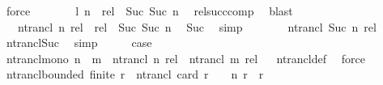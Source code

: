 \begin{isabellebody}
\ force\isanewline
\ \ \isamarkupfalse%
\ \isamarkupfalse%
\ {\isachardoublequoteopen}{\isasymdots}\ {\isacharequal}{\kern0pt}\ {\isacharquery}{\kern0pt}l\ n\ {\isasymunion}\ rel\ {\isacharcircum}{\kern0pt}{\isacharcircum}{\kern0pt}\ Suc\ {\isacharparenleft}{\kern0pt}Suc\ n{\isacharparenright}{\kern0pt}{\isachardoublequoteclose}\ \isamarkupfalse%
\ rel{\isacharunderscore}{\kern0pt}succ{\isacharunderscore}{\kern0pt}comp\ \isamarkupfalse%
\ blast\isanewline
\ \ \isamarkupfalse%
\ \isamarkupfalse%
\ {\isachardoublequoteopen}{\isasymdots}\ {\isacharequal}{\kern0pt}\ ntrancl\ n\ rel\ {\isasymunion}\ rel\ {\isacharcircum}{\kern0pt}{\isacharcircum}{\kern0pt}\ Suc\ {\isacharparenleft}{\kern0pt}Suc\ n{\isacharparenright}{\kern0pt}{\isachardoublequoteclose}\ \isamarkupfalse%
\ Suc\ \isamarkupfalse%
\ simp\isanewline
\ \ \isamarkupfalse%
\ \isamarkupfalse%
\ {\isachardoublequoteopen}{\isasymdots}\ {\isacharequal}{\kern0pt}\ ntrancl\ {\isacharparenleft}{\kern0pt}Suc\ n{\isacharparenright}{\kern0pt}\ rel{\isachardoublequoteclose}\ \isamarkupfalse%
\ ntrancl{\isacharunderscore}{\kern0pt}Suc\ \isamarkupfalse%
\ simp\isanewline
\ \ \isamarkupfalse%
\ \isamarkupfalse%
\ {\isacharquery}{\kern0pt}case\ \isacommand{{\isachardot}{\kern0pt}}\isamarkupfalse%
\isanewline
{}\isamarkupfalse%
%
\endisatagproof
{\isafoldproof}%
%
\isadelimproof
\isanewline
%
\endisadelimproof
\isanewline
{}\isamarkupfalse%
\ ntrancl{\isacharunderscore}{\kern0pt}mono{\isacharcolon}{\kern0pt}\ {\isachardoublequoteopen}n\ {\isasymle}\ m\ {\isasymLongrightarrow}\ ntrancl\ n\ rel\ {\isasymsubseteq}\ ntrancl\ m\ rel{\isachardoublequoteclose}%
\isadelimproof
\ %
\endisadelimproof
%
\isatagproof
{}\isamarkupfalse%
\ ntrancl{\isacharunderscore}{\kern0pt}def\ \isamarkupfalse%
\ force%
\endisatagproof
{\isafoldproof}%
%
\isadelimproof
%
\endisadelimproof
\isanewline
\isanewline
{}\isamarkupfalse%
\ ntrancl{\isacharunderscore}{\kern0pt}bounded{\isacharcolon}{\kern0pt}\ {\isachardoublequoteopen}finite\ r\ {\isasymLongrightarrow}\ ntrancl\ {\isacharparenleft}{\kern0pt}card\ r\ {\isacharminus}{\kern0pt}\ {}\ {\isacharplus}{\kern0pt}\ n{\isacharparenright}{\kern0pt}\ r\ {\isacharequal}{\kern0pt}\ r\isactrlsup {\isacharplus}{\kern0pt}{\isachardoublequoteclose}\isanewline
%
\isadelimproof
\ \ %

\end{isabellebody}
